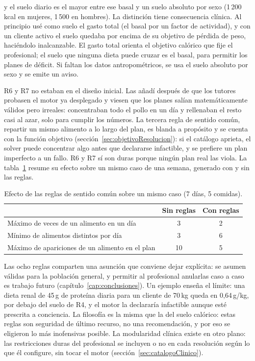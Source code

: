 y el suelo diario es el mayor entre ese basal y un suelo absoluto por sexo (1\,200\,kcal en mujeres, 1\,500 en hombres). La distinción tiene consecuencia clínica. Al principio usé como suelo el gasto total (el basal por un factor de actividad), y con un cliente activo el suelo quedaba por encima de su objetivo de pérdida de peso, haciéndolo inalcanzable. El gasto total orienta el objetivo calórico que fije el profesional; el suelo que ninguna dieta puede cruzar es el basal, para permitir los planes de déficit. Si faltan los datos antropométricos, se usa el suelo absoluto por sexo y se emite un aviso.

R6 y R7 no estaban en el diseño inicial. Las añadí después de que los tutores probasen el motor ya desplegado y viesen que los planes salían matemáticamente válidos pero irreales: concentraban todo el pollo en un día y rellenaban el resto casi al azar, solo para cumplir los números. La tercera regla de sentido común, repartir un mismo alimento a lo largo del plan, es blanda a propósito y se cuenta con la función objetivo (sección~\ref{sec:objetivoResolucion}): si el catálogo aprieta, el solver puede concentrar algo antes que declararse infactible, y se prefiere un plan imperfecto a un fallo. R6 y R7 sí son duras porque ningún plan real las viola. La tabla~\ref{tab:reglasBase} resume su efecto sobre un mismo caso de una semana, generado con y sin las reglas.

\begin{table}[htbp]
\centering
\small
\begin{tabular}{|l|c|c|}
\hline
 & \textbf{Sin reglas} & \textbf{Con reglas} \\
\hline
Máximo de veces de un alimento en un día & 3 & 2 \\
\hline
Mínimo de alimentos distintos por día & 3 & 6 \\
\hline
Máximo de apariciones de un alimento en el plan & 10 & 5 \\
\hline
\end{tabular}
\caption{Efecto de las reglas de sentido común sobre un mismo caso (7 días, 5 comidas).}
\label{tab:reglasBase}
\end{table}

Las ocho reglas comparten una asunción que conviene dejar explícita: se asumen válidas para la población general, y permitir al profesional anularlas caso a caso es trabajo futuro (capítulo~\ref{cap:conclusiones}). Un ejemplo enseña el límite: una dieta renal de 45\,g de proteína diaria para un cliente de 70\,kg queda en 0,64\,g/kg, por debajo del suelo de R4, y el motor la declararía infactible aunque esté prescrita a conciencia. La filosofía es la misma que la del suelo calórico: estas reglas son seguridad de último recurso, no una recomendación, y por eso se eligieron lo más inofensivas posible. La modularidad clínica existe en otro plano: las restricciones duras del profesional se incluyen o no en cada resolución según lo que él configure, sin tocar el motor (sección~\ref{sec:catalogoClinico}).

